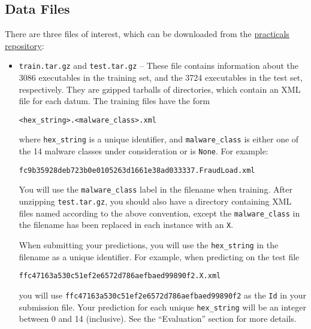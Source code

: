\documentclass[12pt]{article}
\begin{document}
\subsection*{Data Files}
There are three files of interest, which can be downloaded from the \href{https://github.com/harvard-ml-courses/cs181-s18-practicals}{practicals repository}:
\begin{itemize}
\item \verb|train.tar.gz| and \verb|test.tar.gz| -- These file contains information about the 3086 executables in the training set, and the 3724 executables in the test set, respectively. They are gzipped tarballs of directories, which contain an XML file for each datum.  The training files have the form
\begin{center}
\verb|<hex_string>.<malware_class>.xml|
\end{center}
where \verb|hex_string| is a unique identifier, and \verb|malware_class| is either one of the 14 malware classes under consideration or is \verb|None|. For example:
\begin{center}
\verb|fc9b35928deb723b0e0105263d1661e38ad033337.FraudLoad.xml|
\end{center}
You will use the \verb|malware_class| label in the filename when training.  After unzipping \verb|test.tar.gz|, you should also have a directory containing XML files named according to the above convention, except the \verb|malware_class| in the filename has been replaced in each instance with an \verb|X|.

When submitting your predictions, you will use the \verb|hex_string| in the filename as a unique identifier.  For example, when predicting on the test file
\begin{center}
\verb|ffc47163a530c51ef2e6572d786aefbaed99890f2.X.xml|
\end{center}
you will use \verb|ffc47163a530c51ef2e6572d786aefbaed99890f2| as the \verb|Id| in your submission  file. Your prediction for each unique \verb|hex_string| will be an integer between 0 and 14 (inclusive).  See the ``Evaluation'' section for more details.


\end{itemize}
\end{document}
